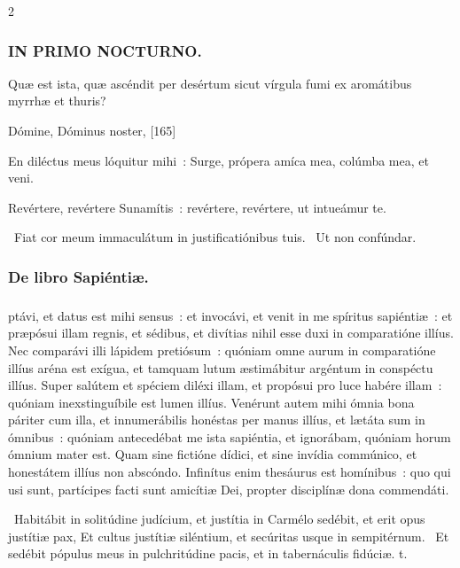\documentclass[9pt,twoside]{extarticle}
\begin{document}
\begin{multicols}{2}
{\subsubsection*{\center \textsc{IN PRIMO NOCTURNO.}}
\begin{tightlist}{}
\item {} Quæ est ista, quæ ascéndit per desértum sicut vírgula fumi ex aromátibus myrrhæ et thuris?
\item {} Dómine, Dóminus noster,  [165]
\item {} En diléctus meus lóquitur mihi~: Surge, própera amíca mea, colúmba mea, et veni.
\item {} Revértere, revértere Sunamítis~: revértere, revértere, ut intueámur te.
\item {}~Fiat cor meum immaculátum in justificatiónibus tuis. ~Ut non confúndar.
\item {}
\end{tightlist}

\subsubsection*{\center De libro Sapiéntiæ.}
\subsubsection*{\center {} \hfill {}}
ptávi, et datus est mihi sensus~: et invocávi, et venit in me spíritus sapiéntiæ~: et præpósui illam regnis, et sédibus, et divítias nihil esse duxi in comparatióne illíus. Nec comparávi illi lápidem pretiósum~: quóniam omne aurum in comparatióne illíus aréna est exígua, et tamquam lutum æstimábitur argéntum in conspéctu illíus. Super salútem et spéciem diléxi illam, et propósui pro luce habére illam~: quóniam inexstinguíbile est lumen illíus. Venérunt autem mihi ómnia bona páriter cum illa, et innumerábilis honéstas per manus illíus, et lætáta sum in ómnibus~: quóniam antecedébat me ista sapiéntia, et ignorábam, quóniam horum ómnium mater est. Quam sine fictióne dídici, et sine invídia commúnico, et honestátem illíus non abscóndo. Infinítus enim thesáurus est homínibus~: quo qui usi sunt, partícipes facti sunt amicítiæ Dei, propter disciplínæ dona commendáti.

\begin{tightlist}{}
\item {}~Habitábit in solitúdine judícium, et justítia in Carmélo sedébit, et erit opus justítiæ pax, \textred{*} Et cultus justítiæ siléntium, et secúritas usque in sempitérnum. ~Et sedébit pópulus meus in pulchritúdine pacis, et in tabernáculis fidúciæ. t.
\end{tightlist}

}
\end{multicols}
\end{document}
